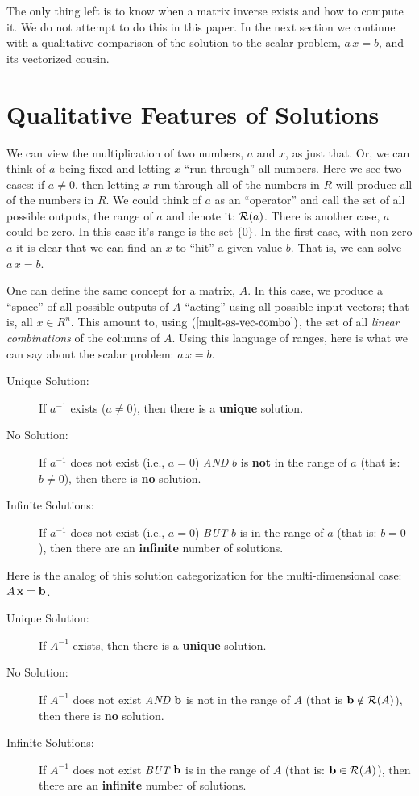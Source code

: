 \documentclass{article}
\begin{document}
The only thing left is to know when a matrix inverse exists and how to compute it.
We do not attempt to do this in this paper. In the next section we continue with
a qualitative comparison of the solution to the scalar problem, $a\, x = b$, 
and its vectorized cousin.


\section{Qualitative Features of Solutions}
We can view the multiplication of two numbers, $a$ and $x$, as just that.
Or, we can think of $a$ being fixed and letting $x$ ``run-through'' all 
numbers. Here we see two cases: if $a \neq 0$, then letting $x$ run
through all of the numbers in $R$ will produce all of the numbers in $R$.
We could think of $a$ as an ``operator'' and call the set of all possible 
outputs, the range of $a$ and denote it: ${\cal R}(a)$.
There is another case, $a$ could be zero. In this case it's range is the
set $\{0\}$. In the first case, with non-zero $a$ it is clear that we can
find an $x$ to ``hit'' a given value $b$. That is, we can solve $a\, x = b$.

One can define the same concept for a matrix, $A$. In this case, we produce a 
``space'' of all possible outputs of $A$ ``acting'' using all possible input vectors; 
that is, all $x \in R^n$. This amount to, using $(\ref{mult-as-vec-combo})$, the set of all 
{\em linear combinations\/} of the columns of $A$. Using this language
of ranges, here is what we can say about the scalar problem: $a \, x = b$.
\begin{description}
	\item[Unique Solution:]{If $a^{-1}$ exists ($a \neq 0$), 
		then there is a {\bf unique\/} solution.}
\item[No Solution:]{If $a^{-1}$ does not exist (i.e., $a = 0$) {\em AND\/}
	$b$ is {\bf not\/} in the range of $a$ (that is: $b \ne 0$), then there is {\bf no\/} solution.}
\item[Infinite Solutions:]{If $a^{-1}$ does not exist (i.e., $a = 0$) {\em BUT\/}
	$b$ is in the range of $a$ (that is: $b = 0$), 
	then there are an {\bf infinite\/} number of solutions.}
\end{description}

Here is the analog of this solution categorization for the multi-dimensional case: $A \, {\bf x} = {\bf b}$.
\begin{description}
	\item[Unique Solution:]{If $A^{-1}$ exists, 
		then there is a {\bf unique\/} solution.}
\item[No Solution:]{If $A^{-1}$ does not exist {\em AND\/}
	${\bf b\/}$ is not in the range of $A$ (that is ${\bf b} \notin {\cal R}(A)$),
then there is {\bf no\/} solution.}  
\item[Infinite Solutions:]{If $A^{-1}$ does not exist {\em BUT\/}
		${\bf b\/}$ is in the range of $A$ (that is: ${\bf b} \in {\cal R}(A)$),
then there are an {\bf infinite\/} number of solutions.} 
\end{description}
\end{document}
